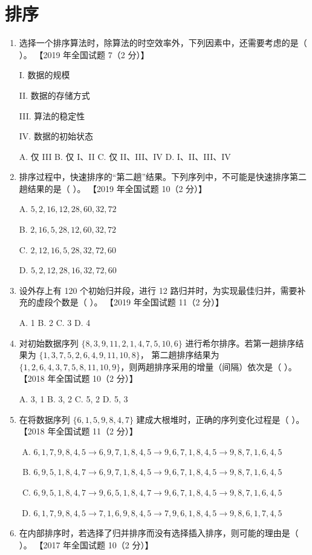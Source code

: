 \documentclass[lang=cn,newtx,10pt,scheme=chinese]{../../elegantbook}
\begin{document}
\chapter{排序}


\begin{enumerate}
    \item 选择一个排序算法时，除算法的时空效率外，下列因素中，还需要考虑的是（ ）。  
    【2019 年全国试题 7（2 分）】  

    I. 数据的规模  

    II. 数据的存储方式  

    III. 算法的稳定性  

    IV. 数据的初始状态  



    A. 仅 III \quad B. 仅 I、II \quad C. 仅 II、III、IV \quad D. I、II、III、IV

    \item 排序过程中，快速排序的“第二趟”结果。下列序列中，不可能是快速排序第二趟结果的是（ ）。  
    【2019 年全国试题 10（2 分）】  

    A. $5, 2, 16, 12, 28, 60, 32, 72$  

    B. $2, 16, 5, 28, 12, 60, 32, 72$ 

    C. $2, 12, 16, 5, 28, 32, 72, 60$  

    D. $5, 2, 12, 28, 16, 32, 72, 60$  

    \item 设外存上有 120 个初始归并段，进行 12 路归并时，为实现最佳归并，需要补充的虚段个数是（ ）。  
    【2019 年全国试题 11（2 分）】 

    A. 1 \quad B. 2 \quad C. 3 \quad D. 4  

    \item 对初始数据序列 $\{8, 3, 9, 11, 2, 1,4, 7, 5, 10, 6\}$ 进行希尔排序。若第一趟排序结果为 $\{1,3,7,5,2,6,4, 9, 11, 10, 8\}$，
    第二趟排序结果为 $\{1, 2, 6, 4, 3, 7, 5, 8,11, 10, 9\}$，则两趟排序采用的增量（间隔）依次是（ ）。  
    【2018 年全国试题 10（2 分）】 

    A. 3, 1 \quad B. 3, 2 \quad C. 5, 2 \quad D. 5, 3  

    \item 在将数据序列 $\{6, 1, 5, 9, 8, 4, 7\}$ 建成大根堆时，正确的序列变化过程是（ ）。  
    【2018 年全国试题 11（2 分）】

    \begin{enumerate}[A.]
    \item $6, 1, 7, 9, 8, 4, 5 \to 6, 9, 7, 1, 8, 4, 5 \to 9, 6, 7, 1, 8, 4, 5 \to 9, 8, 7, 1, 6, 4, 5$
    \item $6, 9, 5, 1, 8, 4, 7 \to 6, 9, 7, 1, 8, 4, 5 \to 9, 6, 7, 1, 8, 4, 5 \to 9, 8, 7, 1, 6, 4, 5$
    \item $6, 9, 5, 1, 8, 4, 7 \to 9, 6, 5, 1, 8, 4, 7 \to 9, 6, 7, 1, 8, 4, 5 \to 9, 8, 7, 1, 6, 4, 5$
    \item $6, 1, 7, 9, 8, 4, 5 \to 7, 1, 6, 9, 8, 4, 5 \to 7, 9, 6, 1, 8, 4, 5 \to 9, 8, 6, 1, 7, 4, 5$
    \end{enumerate}
    \item 在内部排序时，若选择了归并排序而没有选择插入排序，则可能的理由是（ ）。  
    【2017 年全国试题 10（2 分）】  


\end{enumerate}
\end{document}
